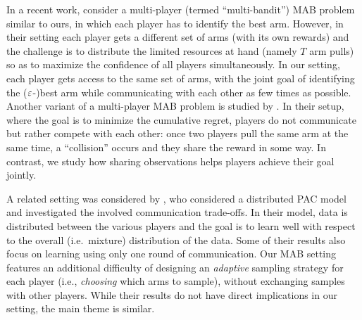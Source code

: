 In a recent work, \citet{gabillon2011multi} consider a multi-player (termed ``multi-bandit'') MAB problem similar to ours, in which each player has to identify the best arm.
However, in their setting each player gets a different set of arms (with its own rewards) and the challenge is to distribute the limited resources at hand (namely $T$ arm pulls) so as to maximize the confidence of all players simultaneously. In our setting, each player gets access to the same set of arms, with the joint goal of identifying the ($\varepsilon$-)best arm while communicating with each other as few times as possible.
Another variant of a multi-player MAB problem is studied by \citet{liu2010distributed}. In their setup, where the goal is to minimize the cumulative regret, players do not communicate but rather compete with each other: once two players pull the same arm at the same time, a ``collision'' occurs and they share the reward in some way. In contrast, we study how sharing observations helps players achieve their goal jointly.

A related setting was considered by \citet{balcan12}, who considered a distributed PAC model and investigated the involved communication trade-offs. 
In their model, data is distributed between the various players and the goal is to learn well with respect to the overall (i.e.~mixture) distribution of the data. 
Some of their results also focus on learning using only one round of communication.
Our MAB setting features an additional difficulty of designing an \emph{adaptive} sampling strategy for each player (i.e., \emph{choosing} which arms to sample), without exchanging samples with other players. 
While their results do not have direct implications in our setting, the main theme is similar.



%

